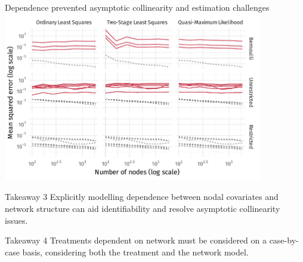 \documentclass[aspectratio=169]{beamer}
\theoremstyle{remark}
\begin{document}
\begin{frame}{Dependence prevented \textcolor{BrickRed}{asymptotic collinearity} and estimation challenges}
    \centering
    \includegraphics[width=0.85\textwidth]{./figures/simulations/jobtalk-mse-all.pdf}
\end{frame}

\begin{frame}

    \begin{block}{Takeaway 3}
        Explicitly modelling dependence between nodal covariates and network structure can aid identifiability and resolve asymptotic collinearity issues.
    \end{block}
    \vspace{4mm}
    \begin{block}{Takeaway 4}
        Treatments dependent on network must be considered on a case-by-case basis, considering both the treatment and the network model.
    \end{block}
\end{frame}
\end{document}
